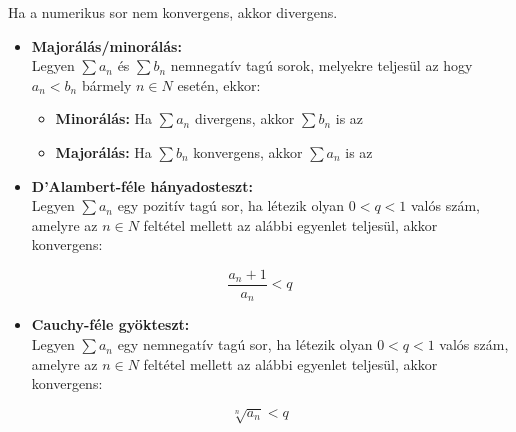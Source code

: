 \documentclass[12pt,a4paper]{article}
\begin{document}
\begin{tcolorbox}[colback=green!5!white,colframe=green!60!black,title= 3. Numerikus sor divergenciája]
    Ha a numerikus sor nem konvergens, akkor divergens.
\end{tcolorbox}

\begin{tcolorbox}[colback=green!5!white,colframe=green!60!black,title= 4. Konvergencia tesztek]
    \begin{itemize}
        \item \textbf{Majorálás/minorálás:}\\
        Legyen \(\sum a_n\) és \(\sum b_n\) nemnegatív tagú sorok, melyekre teljesül az hogy \(a_n < b_n\) bármely \(n \in N\)
        esetén, ekkor:
        \begin{itemize}
        \item \textbf{Minorálás:} Ha \(\sum a_n\) divergens, akkor \(\sum b_n\) is az
        \item \textbf{Majorálás:} Ha \(\sum b_n\) konvergens, akkor \(\sum a_n\) is az
        \end{itemize}
    \end{itemize}
    \begin{itemize}
        \item \textbf{D'Alambert-féle hányadosteszt:}\\
        Legyen \(\sum a_n\) egy pozitív tagú sor, ha létezik olyan \(0 < q < 1\) valós szám, amelyre az \(n \in N\) feltétel
mellett az alábbi egyenlet teljesül, akkor konvergens:
    \end{itemize}
    $$\frac{a_n +1}{a_n} < q$$
    \begin{itemize}
        \item \textbf{Cauchy-féle gyökteszt:}\\
        Legyen \(\sum a_n\) egy nemnegatív tagú sor, ha létezik olyan \(0 < q < 1\) valós szám, amelyre az \(n \in N\)
feltétel mellett az alábbi egyenlet teljesül, akkor konvergens:
    \end{itemize}
    $$\sqrt[n]{a_n} < q$$
\end{tcolorbox}
\end{document}
